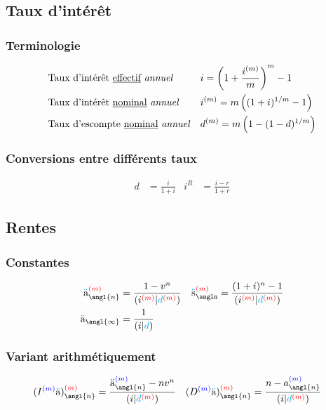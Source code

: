 \documentclass[10pt, french]{article}
\newcommand\cumlaut[2][black]{\stackon[.33ex]{#2}{\textcolor{#1}{\kern-.04ex.\kern-.2ex.}}}
\begin{document}
\begin{multicols*}{3}
\subsection*{Taux d'intérêt}
\subsubsection*{Terminologie}
\begin{align*}
&\text{Taux d'intérêt \underline{effectif} \textit{annuel}} & & i = \left( 1 + \frac{i^{(m)}}{m} \right)^{m} - 1 \\
&\text{Taux d'intérêt \underline{nominal} \textit{annuel}} & & i^{(m)} = m \left( (1 + i)^{1/m} - 1 \right)	\\
&\text{Taux d'escompte \underline{nominal} \textit{annuel}} & 
	& d^{(m)} = m \left( 1 - (1 - d)^{1/m} \right)
\end{align*}

\subsubsection*{Conversions entre différents taux}
\begin{align*}
	d	&= 	\frac{i}{1 + i} &
	i^{R}
		&=	\frac{i - r}{1 + r}
\end{align*}


\subsection*{Rentes}
\subsubsection*{Constantes}
\begin{align*}
	\cumlaut[cyan]{a}_{\angl{n}}^{\textcolor{red}{(m)}} 
		&= \frac{1 - v^n}{ (i^{\textcolor{red}{(m)}}{\color{black}|}{\color{cyan}d}^{\textcolor{red}{(m)}}{\color{black})}}	&
	\cumlaut[cyan]{s}_{\angln}^{\textcolor{red}{(m)}} 
		&=	\frac{(1+i)^{n} - 1}{(i^{\textcolor{red}{(m)}} | \textcolor{cyan}{d}^{\textcolor{red}{(m)}})}	\\
	\cumlaut[cyan]{a}_{\angl{\infty}} 
		&= \frac{1}{(i|\textcolor{cyan}{d})}
\end{align*}

\subsubsection*{Variant arithmétiquement}
\begin{align*}
	(I^{\textcolor{blue}{(m)}}\cumlaut[cyan]{a})_{\angl{n}}^{\textcolor{red}{(m)}} 
		&= \frac{\cumlaut[black]{a}_{\angl{n}}^{\textcolor{blue}{(m)}} - nv^n}{(i | \textcolor{cyan}{d}^{\textcolor{red}{(m)}})} &
	(D^{\textcolor{blue}{(m)}}\cumlaut[cyan]{a})_{\angl{n}}^{\textcolor{red}{(m)}} 
		&= \frac{n - a_{\angl{n}}^{\textcolor{blue}{(m)}}}{(i | \textcolor{cyan}{d}^{\textcolor{red}{(m)}})}
\end{align*}


\end{multicols*}
\end{document}
